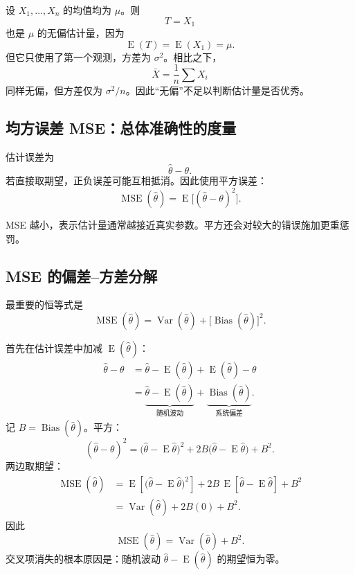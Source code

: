 \documentclass[11pt,a4paper]{article}
\newcommand{\E}{\operatorname{E}}
\newcommand{\Var}{\operatorname{Var}}
\newcommand{\Bias}{\operatorname{Bias}}
\newcommand{\MSE}{\operatorname{MSE}}
\begin{document}
\begin{examplebox}[一个无偏但可能很不稳定的估计量]
设 $X_1,\ldots,X_n$ 的均值均为 $\mu$。则
\[
  T=X_1
\]
也是 $\mu$ 的无偏估计量，因为
\[
  \E(T)=\E(X_1)=\mu.
\]
但它只使用了第一个观测，方差为 $\sigma^2$。相比之下，
\[
  \bar X=\frac1n\sum X_i
\]
同样无偏，但方差仅为 $\sigma^2/n$。因此“无偏”不足以判断估计量是否优秀。
\end{examplebox}

\subsection{均方误差 MSE：总体准确性的度量}

估计误差为
\[
  \hat\theta-\theta.
\]
若直接取期望，正负误差可能互相抵消。因此使用平方误差：
\[
  \boxed{
  \MSE(\hat\theta)
  =
  \E\bigl[(\hat\theta-\theta)^2\bigr].
  }
\]

MSE 越小，表示估计量通常越接近真实参数。平方还会对较大的错误施加更重惩罚。

\subsection{MSE 的偏差--方差分解}

最重要的恒等式是
\[
  \boxed{
  \MSE(\hat\theta)
  =
  \Var(\hat\theta)
  +
  \bigl[\Bias(\hat\theta)\bigr]^2.
  }
\]

\begin{proofbox}[逐步证明]
首先在估计误差中加减 $\E(\hat\theta)$：
\[
\begin{aligned}
  \hat\theta-\theta
  &=
  \hat\theta-\E(\hat\theta)
  +
  \E(\hat\theta)-\theta\\
  &=
  \underbrace{\hat\theta-\E(\hat\theta)}_{\text{随机波动}}
  +
  \underbrace{\Bias(\hat\theta)}_{\text{系统偏差}}.
\end{aligned}
\]
记 $B=\Bias(\hat\theta)$。平方：
\[
  (\hat\theta-\theta)^2
  =
  \bigl(\hat\theta-\E\hat\theta\bigr)^2
  {}+2B\bigl(\hat\theta-\E\hat\theta\bigr)
  {}+B^2.
\]
两边取期望：
\[
\begin{aligned}
  \MSE(\hat\theta)
  &=
  \E\left[\bigl(\hat\theta-\E\hat\theta\bigr)^2\right]
  {}+2B\,\E\left[\hat\theta-\E\hat\theta\right]
  {}+B^2\\
  &=
  \Var(\hat\theta)+2B(0)+B^2.
\end{aligned}
\]
因此
\[
  \MSE(\hat\theta)=\Var(\hat\theta)+B^2.
\]
交叉项消失的根本原因是：随机波动
$\hat\theta-\E(\hat\theta)$ 的期望恒为零。
\end{proofbox}
\end{document}

